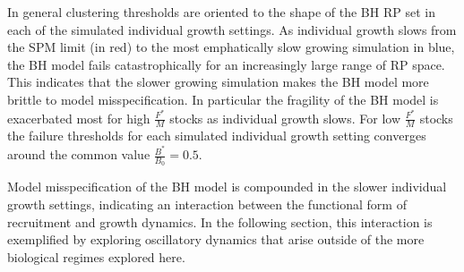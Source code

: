 
%
In general clustering thresholds are oriented to the shape of the BH RP set in each of the simulated individual 
growth settings. As individual growth slows from the SPM limit (in red) to the most emphatically slow growing 
simulation in blue, the BH model fails catastrophically for an increasingly large range of RP space. 
This indicates that the slower growing simulation makes the BH model more brittle to model misspecification. 
In particular the fragility of the BH model is exacerbated most for high $\frac{F^*}{M}$ stocks as individual growth slows. %
For low $\frac{F^*}{M}$ stocks the failure thresholds for each simulated individual growth setting %
converges around the common value $\frac{B^*}{B_0}=0.5$.


%
Model misspecification of the BH model is compounded in the slower individual 
growth settings, indicating an interaction between the functional form of 
recruitment and growth dynamics. In the following section, this interaction is 
exemplified by exploring oscillatory dynamics that arise outside of the more 
biological regimes explored here.




